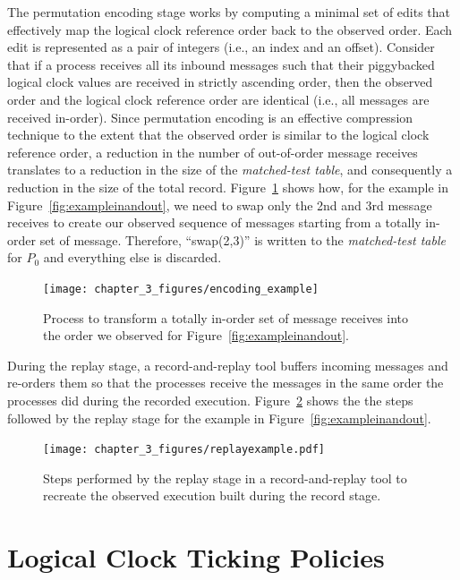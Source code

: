 The permutation encoding stage works by computing a minimal set of
edits that effectively map the logical clock reference order back to
the observed order. Each edit is represented as a pair of integers
(i.e., an index and an offset). Consider that if a process receives
all its inbound messages such that their piggybacked logical clock
values are received in strictly ascending order, then the observed
order and the logical clock reference order are identical (i.e., all
messages are received in-order). Since permutation encoding is an
effective compression technique to the extent that the observed order
is similar to the logical clock reference order, a reduction in the
number of out-of-order message receives translates to a reduction in
the size of the \textit{matched-test table}, and consequently a
reduction in the size of the total record.
Figure~\ref{fig:encoding_example} shows how, for the example in
Figure~\ref{fig:exampleinandout}, we need to swap only the 2nd and 3rd
message receives to create our observed sequence of messages starting
from a totally in-order set of message. Therefore, ``swap(2,3)'' is
written to the \textit{matched-test table} for $P_0$ and everything
else is discarded.
\begin{figure}[!htb]
    \centering
    \texttt{[image: chapter\_3\_figures/encoding\_example]}
    \caption{Process to transform a totally in-order set of message
      receives into the order we observed for
      Figure~\ref{fig:exampleinandout}.}
    \label{fig:encoding_example}
\end{figure}

During the replay stage, a record-and-replay tool buffers incoming
messages and re-orders them so that the processes receive the messages
in the same order the processes did during the recorded
execution. Figure~\ref{fig:replay_example} shows the the steps
followed by the replay stage for the example in
Figure~\ref{fig:exampleinandout}.
\begin{figure}[!htb]
    \centering
    \texttt{[image: chapter\_3\_figures/replayexample.pdf]}
    \caption{Steps performed by the replay stage in a record-and-replay
      tool to recreate the observed execution built during the record
      stage.}
    \label{fig:replay_example}
\end{figure}

\section{Logical Clock Ticking Policies}

